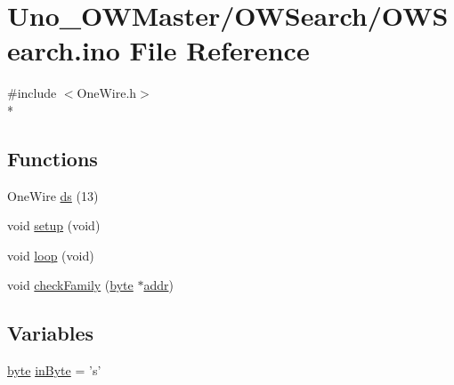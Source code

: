 \hypertarget{OWSearch_8ino}{\section{Uno\-\_\-\-O\-W\-Master/\-O\-W\-Search/\-O\-W\-Search.ino File Reference}
\label{OWSearch_8ino}
}
{\ttfamily \#include $<$One\-Wire.\-h$>$}\\*
\subsection*{Functions}
\begin{DoxyCompactItemize}
\item 
One\-Wire \hyperlink{OWSearch_8ino_a7ac2589d8de3c5bc02dcfe7fc62068e7}{ds} (13)
\item 
void \hyperlink{OWSearch_8ino_a7dfd9b79bc5a37d7df40207afbc5431f}{setup} (void)
\item 
void \hyperlink{OWSearch_8ino_a0b33edabd7f1c4e4a0bf32c67269be2f}{loop} (void)
\item 
void \hyperlink{OWSearch_8ino_a9a919d3a96bcb356e716cc5e9d8197a2}{check\-Family} (\hyperlink{Arduino_8h_ab8ef12fab634c171394422d0ee8baf94}{byte} $\ast$\hyperlink{OWP__DG__1w-adaptor_8ino_a0fc5da2e63a94559429ec9aec32f1831}{addr})
\end{DoxyCompactItemize}
\subsection*{Variables}
\begin{DoxyCompactItemize}
\item 
\hyperlink{Arduino_8h_ab8ef12fab634c171394422d0ee8baf94}{byte} \hyperlink{OWSearch_8ino_a62cd173143ff9c15a38fd17ab56970c9}{in\-Byte} = 's'
\end{DoxyCompactItemize}


